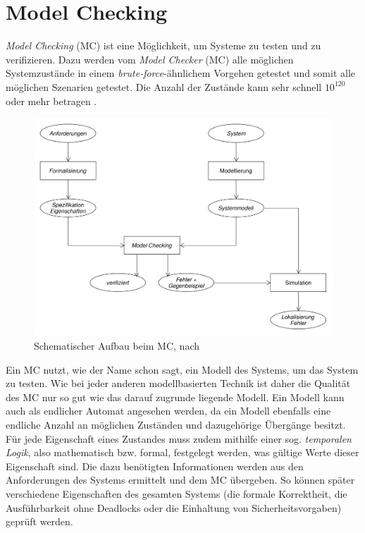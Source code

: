 \section{Model Checking}\label{sec:modelchecking}

\emph{Model Checking} (MC) ist eine Möglichkeit, um Systeme zu testen und zu verifizieren. Dazu werden vom \emph{Model Checker} (MC) alle möglichen Systemzustände in einem \emph{brute-force}-ähnlichem Vorgehen getestet und somit alle möglichen Szenarien getestet. Die Anzahl der Zustände kann sehr schnell $ 10^{120} $ oder mehr betragen \cite{Grumberg1999,Baier2008}.

\begin{figure}
	\centering
	\includegraphics[width=\columnwidth]{./images/mcSchema.pdf}
	\caption[Schematischer Aufbau beim MC]{Schematischer Aufbau beim MC, nach \cite{Baier2008}}
	\label{fig:mcSchema}
\end{figure}

Ein MC nutzt, wie der Name schon sagt, ein Modell des Systems, um das System zu testen. Wie bei jeder anderen modellbasierten Technik ist daher die Qualität des MC nur so gut wie das darauf zugrunde liegende Modell. Ein Modell kann auch als endlicher Automat angesehen werden, da ein Modell ebenfalls eine endliche Anzahl an möglichen Zuständen und dazugehörige Übergänge besitzt. Für jede Eigenschaft eines Zustandes muss zudem mithilfe einer sog. \emph{temporalen Logik}, also mathematisch bzw. formal, festgelegt werden, was gültige Werte dieser Eigenschaft sind. Die dazu benötigten Informationen werden aus den Anforderungen des Systems ermittelt und dem MC übergeben. So können später verschiedene Eigenschaften des gesamten Systems (\zB die formale Korrektheit, die Ausführbarkeit ohne Deadlocks oder die Einhaltung von Sicherheitsvorgaben) geprüft werden.

